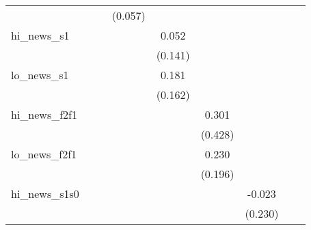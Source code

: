 {\begin{tabular}{l*{8}{c}}
            &                     &                     &     (0.057)         &                     &                     &                     &                     &                     \\
\addlinespace
hi\_news\_s1  &                     &                     &                     &       0.052         &                     &                     &                     &                     \\
            &                     &                     &                     &     (0.141)         &                     &                     &                     &                     \\
\addlinespace
lo\_news\_s1  &                     &                     &                     &       0.181         &                     &                     &                     &                     \\
            &                     &                     &                     &     (0.162)         &                     &                     &                     &                     \\
\addlinespace
hi\_news\_f2f1&                     &                     &                     &                     &       0.301         &                     &                     &                     \\
            &                     &                     &                     &                     &     (0.428)         &                     &                     &                     \\
\addlinespace
lo\_news\_f2f1&                     &                     &                     &                     &       0.230         &                     &                     &                     \\
            &                     &                     &                     &                     &     (0.196)         &                     &                     &                     \\
\addlinespace
hi\_news\_s1s0&                     &                     &                     &                     &                     &      -0.023         &                     &                     \\
            &                     &                     &                     &                     &                     &     (0.230)         &                     &                     \\

\end{tabular}}
